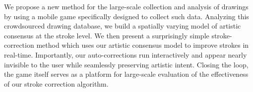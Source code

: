 
We propose a new method for the large-scale collection and analysis
of drawings by using a mobile game specifically designed to
collect such data. Analyzing this crowdsourced
drawing database, we build a spatially varying model of artistic
consensus at the stroke level. We then present a surprisingly simple
stroke-correction method which uses our artistic consensus model to
improve strokes in real-time. Importantly, our auto-corrections run
interactively and appear nearly invisible to the user while
seamlessly preserving artistic intent. Closing the loop, the game
itself serves as a platform for large-scale evaluation of the
effectiveness of our stroke correction algorithm.
